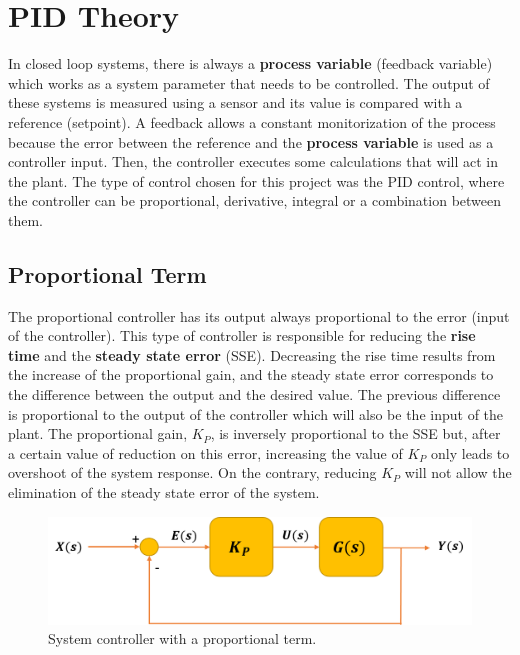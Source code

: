 \section{PID Theory}\label{sec:pid_theory}

In closed loop systems, there is always a \textbf{process variable} (feedback variable) which works as a system parameter that needs to be controlled. The output of these systems is measured using a sensor and its value is compared with a reference (setpoint). A feedback allows a constant monitorization of the process because the error between the reference and the \textbf{process variable} is used as a controller input. Then, the controller executes some calculations that will act in the plant. The type of control chosen for this project was the PID control, where the controller can be proportional, derivative, integral or a combination between them. 

\subsection*{Proportional Term}

The proportional controller has its output always proportional to the error (input of the controller). This type of controller is responsible for reducing the \textbf{rise time} and the \textbf{steady state error} (SSE). Decreasing the rise time results from the increase of the proportional gain, and the steady state error corresponds to the difference between the output and the desired value. The previous difference is proportional to the output of the controller which will also be the input of the plant. The proportional gain, $K_P$, is inversely proportional to the SSE but, after a certain value of reduction on this error, increasing the value of $K_P$ only leads to overshoot of the system response. On the contrary, reducing $K_P$ will not allow the elimination of the steady state error of the system. 

\begin{figure}[H]
	\centering
	\includegraphics[scale=0.6]{figures/propor_controller.png}
	\caption{System controller with a proportional term.}
	\label{propor_controller}
\end{figure}

